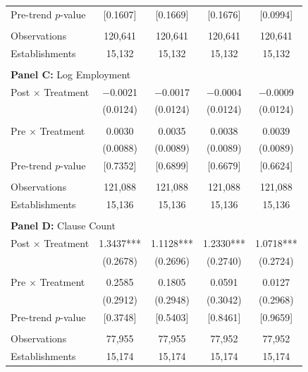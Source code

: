 \begin{table}[H]
\begin{threeparttable}
\begin{tabular}{lcccc}
Pre-trend $p$-value & [0.1607] & [0.1669] & [0.1676] & [0.0994] \\
  &  &  &  & \\
Observations & 120{,}641 & 120{,}641 & 120{,}641 & 120{,}641 \\
Establishments & 15{,}132 & 15{,}132 & 15{,}132 & 15{,}132 \\
  &  &  &  & \\
\midrule
\multicolumn{5}{l}{\textbf{Panel C:} Log Employment} \\
\midrule
Post $\times$ Treatment & $-$0.0021 & $-$0.0017 & $-$0.0004 & $-$0.0009 \\
  & (0.0124) & (0.0124) & (0.0124) & (0.0124) \\
  &  &  &  & \\
Pre $\times$ Treatment & 0.0030 & 0.0035 & 0.0038 & 0.0039 \\
  & (0.0088) & (0.0089) & (0.0089) & (0.0089) \\
Pre-trend $p$-value & [0.7352] & [0.6899] & [0.6679] & [0.6624] \\
  &  &  &  & \\
Observations & 121{,}088 & 121{,}088 & 121{,}088 & 121{,}088 \\
Establishments & 15{,}136 & 15{,}136 & 15{,}136 & 15{,}136 \\
  &  &  &  & \\
\midrule
\multicolumn{5}{l}{\textbf{Panel D:} Clause Count} \\
\midrule
Post $\times$ Treatment & 1.3437*** & 1.1128*** & 1.2330*** & 1.0718*** \\
  & (0.2678) & (0.2696) & (0.2740) & (0.2724) \\
  &  &  &  & \\
Pre $\times$ Treatment & 0.2585 & 0.1805 & 0.0591 & 0.0127 \\
  & (0.2912) & (0.2948) & (0.3042) & (0.2968) \\
Pre-trend $p$-value & [0.3748] & [0.5403] & [0.8461] & [0.9659] \\
  &  &  &  & \\
Observations & 77{,}955 & 77{,}955 & 77{,}952 & 77{,}952 \\
Establishments & 15{,}174 & 15{,}174 & 15{,}174 & 15{,}174 \\
\bottomrule
\end{tabular}
\scriptsize
\begin{tablenotes}

\end{tablenotes}
\end{threeparttable}
\end{table}

